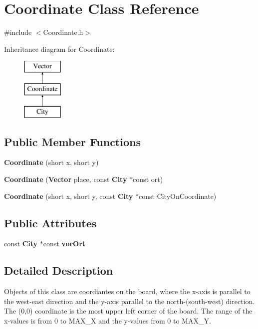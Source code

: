 \section{Coordinate Class Reference}
\label{class_coordinate}


{\ttfamily \#include $<$Coordinate.\-h$>$}

Inheritance diagram for Coordinate\-:\begin{figure}[H]
\begin{center}
\leavevmode
\includegraphics[height=3.000000cm]{class_coordinate}
\end{center}
\end{figure}
\subsection*{Public Member Functions}
\begin{DoxyCompactItemize}
\item 
{\bf Coordinate} (short x, short y)
\item 
{\bfseries Coordinate} ({\bf Vector} place, const {\bf City} $\ast$const ort)\label{class_coordinate_aa299c35ffbf14f830e03f295bb00ffbe}

\item 
{\bf Coordinate} (short x, short y, const {\bf City} $\ast$const City\-On\-Coordinate)
\end{DoxyCompactItemize}
\subsection*{Public Attributes}
\begin{DoxyCompactItemize}
\item 
const {\bf City} $\ast$const {\bf vor\-Ort}
\end{DoxyCompactItemize}


\subsection{Detailed Description}
Objects of this class are coordiantes on the board, where the x-\/axis is parallel to the west-\/east direction and the y-\/axis parallel to the north-\/(south-\/west) direction. The (0,0) coordinate is the most upper left corner of the board. The range of the x-\/values is from 0 to M\-A\-X\-\_\-\-X and the y-\/values from 0 to M\-A\-X\-\_\-\-Y. 

